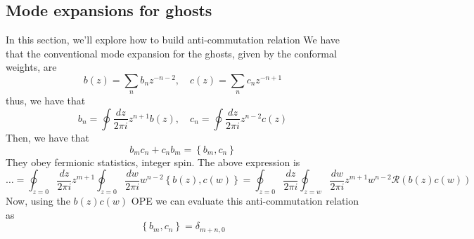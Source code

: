 \documentclass[11pt, oneside]{article}   	%
\theoremstyle{slanted}
\begin{document}
\subsection{Mode expansions for ghosts}
In this section, we'll explore how to 
build anti-commutation relation 
We have that the conventional mode expansion 
for the ghosts, given by the conformal weights, 
are 
\[
	b \left(  z  \right)   = \sum _ n b _ n z ^{  -n -  2 } , \quad c \left(  z  \right)  
	 = \sum _ n c _ n z ^{ - n + 1 } 
\] thus, we have that 
\[
	b _ n  = \oint \frac{dz }{ 2 \pi i } z ^{ n + 1 } b \left( z  \right)  , \quad 
	c _ n  = \oint \frac{dz  }{ 2 \pi i  } z ^{ n - 2 } c \left(  z  \right) 
\]  Then, we have that 
\[
 b _ m c _ n + c _ n b _ m  = \left\{  b _ m , c _ n  \right\} 
\] They obey fermionic statistics, 
integer spin. 
The above expression is 
\[
 \dots = \oint_{ z = 0 } \frac{dz   }{ 2 \pi i } z ^{ m + 1 } 
 \oint _{ z = 0  } \frac{dw   }{ 2 \pi i } w ^{ n -2  } \left\{  b \left(  z  \right)  , c \left(  w  \right)   \right\} 
   = \oint_{ z  =0 } \frac{dz  }{ 2 \pi i } \oint _{ z = w } \frac{dw }{ 2 \pi i } 
   z ^{ m + 1  } w ^{ n -  2 } \mathcal{ R } \left( b \left(  z  \right)  c \left(  w  \right)   \right) 
\] Now, using the 
$ b \left( z   \right)  c \left( w   \right)  $ OPE 
we can evaluate this anti-commutation relation as 
\[
 \left\{  b _ m , c _ n  \right\}   = \delta _{ m + n , 0 }
\] 
\end{document}
